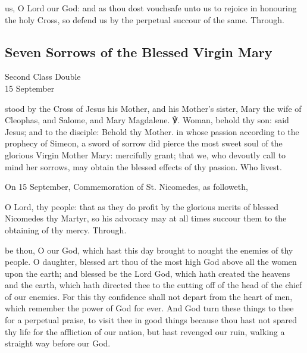 
\postcommunion
{} us, O Lord our God: and as thou dost vouchsafe unto us to rejoice in honouring the holy Cross, so defend us by the perpetual succour of the same. Through.


\subsection{Seven Sorrows of the Blessed Virgin Mary}
\begin{inhead}
    {Second Class Double\\
15 September}
\end{inhead}

\introit
{} stood by the Cross of Jesus his Mother, and his Mother's sister, Mary the wife of Cleophas, and Salome, and Mary Magdalene. ℣. Woman, behold thy son: said Jesus; and to the disciple: Behold thy Mother.
\collect
{} in whose passion according to the prophecy of Simeon, a sword of sorrow did pierce the most sweet soul of the glorious Virgin Mother Mary: mercifully grant; that we, who devoutly call to mind her sorrows, may obtain the blessed effects of thy passion. Who livest.
\begin{rubric}
	 On 15 September, Commemoration of St. Nicomedes, as followeth,
\end{rubric}
 O Lord, thy people: that as they do profit by the glorious merits of blessed Nicomedes thy Martyr, so his advocacy may at all times succour them to the obtaining of thy mercy. Through.

 be thou, O our God, which hast this day brought to nought the enemies of thy people. O daughter, blessed art thou of the most high God above all the women upon the earth; and blessed be the Lord God, which hath created the heavens and the earth, which hath directed thee to the cutting off of the head of the chief of our enemies. For this thy confidence shall not depart from the heart of men, which remember the power of God for ever. And God turn these things to thee for a perpetual praise, to visit thee in good things because thou hast not spared thy life for the affliction of our nation, but hast revenged our ruin, walking a straight way before our God.

